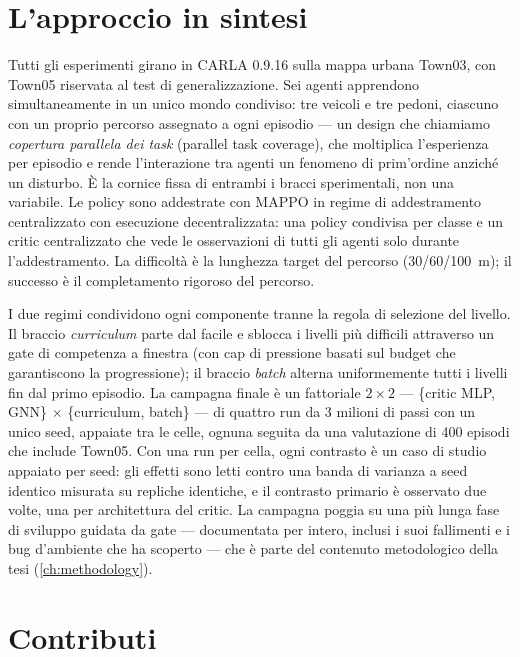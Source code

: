 \section{L'approccio in sintesi}
\label{sec:approach}

Tutti gli esperimenti girano in CARLA 0.9.16 sulla mappa urbana Town03,
con Town05 riservata al test di generalizzazione. Sei agenti apprendono
simultaneamente in un unico mondo condiviso: tre veicoli e tre pedoni,
ciascuno con un proprio percorso assegnato a ogni episodio --- un design
che chiamiamo \emph{copertura parallela dei task} (parallel task
coverage), che moltiplica l'esperienza per episodio e rende
l'interazione tra agenti un fenomeno di prim'ordine anziché un
disturbo. È la cornice fissa di entrambi i bracci sperimentali, non una
variabile. Le policy sono addestrate con MAPPO in regime di
addestramento centralizzato con esecuzione decentralizzata: una policy
condivisa per classe e un critic centralizzato che vede le osservazioni
di tutti gli agenti solo durante l'addestramento. La difficoltà è la
lunghezza target del percorso (30/60/\SI{100}{m}); il successo è il
completamento rigoroso del percorso.

I due regimi condividono ogni componente tranne la regola di selezione
del livello. Il braccio \emph{curriculum} parte dal facile e sblocca i
livelli più difficili attraverso un gate di competenza a finestra (con
cap di pressione basati sul budget che garantiscono la progressione); il
braccio \emph{batch} alterna uniformemente tutti i livelli fin dal primo
episodio. La campagna finale è un fattoriale $2 \times 2$ --- \{critic
MLP, GNN\} $\times$ \{curriculum, batch\} --- di quattro run da 3 milioni
di passi con un unico seed, appaiate tra le celle, ognuna seguita da una
valutazione di 400 episodi che include Town05. Con una run per cella,
ogni contrasto è un caso di studio appaiato per seed: gli effetti sono
letti contro una banda di varianza a seed identico misurata su repliche
identiche, e il contrasto primario è osservato due volte, una per
architettura del critic. La campagna poggia su una più lunga fase di
sviluppo guidata da gate --- documentata per intero, inclusi i suoi
fallimenti e i bug d'ambiente che ha scoperto --- che è parte del
contenuto metodologico della tesi (\cref{ch:methodology}).

\section{Contributi}
\label{sec:contributions}


